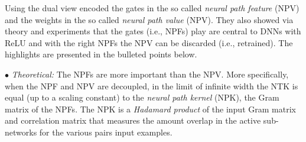 Using the dual view \citet{npk} encoded the gates in the so called \emph{neural path feature} (NPV) and the weights in the so called \emph{neural path value} (NPV). They also showed via  theory and experiments that the gates (i.e., NPFs) play are central to DNNs with ReLU and with the right NPFs the NPV can be discarded (i.e., retrained). The highlights are presented in the bulleted points below.

$\bullet$ \emph{Theoretical:} The NPFs are more important than the NPV. More specifically, when the NPF and NPV are decoupled, in the limit of infinite width the NTK is equal (up to a scaling constant) to the \emph{neural path kernel} (NPK), the Gram matrix of the NPFs. The NPK is a \emph{Hadamard product} of the input Gram matrix and correlation matrix that measures the amount overlap in the active sub-networks for the various pairs input examples.


